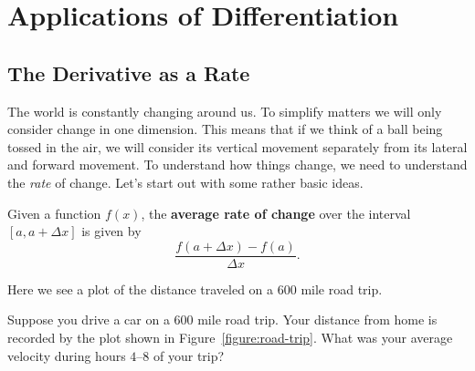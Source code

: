 \chapter{Applications of Differentiation}





\section{The Derivative as a Rate}

The world is constantly changing around us. To simplify matters we
will only consider change in one dimension. This means that if we
think of a ball being tossed in the air, we will consider its vertical
movement separately from its lateral and forward movement.  To
understand how things change, we need to understand the \textit{rate}
of change. Let's start out with some rather basic ideas.

\begin{definition}
Given a function $f(x)$, the \textbf{average rate of change} over the
interval $[a, a+\Delta x]$ is given by
\[
\frac{f(a+\Delta x) - f(a)}{\Delta x}.
\]
\end{definition}
\begin{marginfigure}
\caption{Here we see a plot of the distance traveled on a $600$ mile road trip.}
\label{figure:road-trip}
\end{marginfigure}

\begin{example}
Suppose you drive a car on a $600$ mile road trip. Your distance from
home is recorded by the plot shown in
Figure~\ref{figure:road-trip}. What was your average velocity during
hours $4$--$8$ of your trip?
\end{example}

